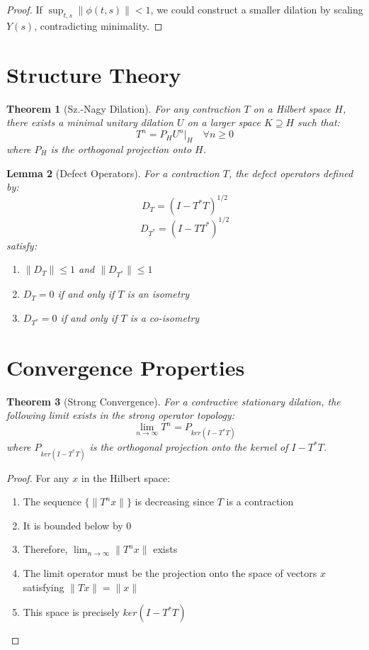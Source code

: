 \documentclass{article}
\newtheorem{theorem}{Theorem}
\newtheorem{lemma}[theorem]{Lemma}
\begin{document}
\begin{proof}
If $\sup_{t,s} \|\phi(t,s)\| < 1$, we could construct a smaller dilation by scaling $Y(s)$, contradicting minimality.
\end{proof}

\section{Structure Theory}

\begin{theorem}[Sz.-Nagy Dilation]
For any contraction $T$ on a Hilbert space $H$, there exists a minimal unitary dilation $U$ on a larger space $K \supseteq H$ such that:
\[ T^n = P_H U^n|_H \quad \forall n \geq 0 \]
where $P_H$ is the orthogonal projection onto $H$.
\end{theorem}

\begin{lemma}[Defect Operators]
For a contraction $T$, the defect operators defined by:
\[ D_T = (I - T^*T)^{1/2} \]
\[ D_{T^*} = (I - TT^*)^{1/2} \]
satisfy:
\begin{enumerate}
    \item $\|D_T\| \leq 1$ and $\|D_{T^*}\| \leq 1$
    \item $D_T = 0$ if and only if $T$ is an isometry
    \item $D_{T^*} = 0$ if and only if $T$ is a co-isometry
\end{enumerate}
\end{lemma}

\section{Convergence Properties}

\begin{theorem}[Strong Convergence]
For a contractive stationary dilation, the following limit exists in the strong operator topology:
\[ \lim_{n \to \infty} T^n = P_{ker(I-T^*T)} \]
where $P_{ker(I-T^*T)}$ is the orthogonal projection onto the kernel of $I-T^*T$.
\end{theorem}

\begin{proof}
For any $x$ in the Hilbert space:
\begin{enumerate}
    \item The sequence $\{\|T^n x\|\}$ is decreasing since $T$ is a contraction
    \item It is bounded below by 0
    \item Therefore, $\lim_{n \to \infty} \|T^n x\|$ exists
    \item The limit operator must be the projection onto the space of vectors $x$ satisfying $\|Tx\| = \|x\|$
    \item This space is precisely $ker(I-T^*T)$
\end{enumerate}
\end{proof}
\end{document}
